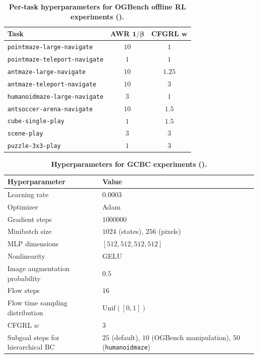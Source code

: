 \documentclass{article}
\begin{document}
\begin{table}[t]
\caption{
\footnotesize
\textbf{Per-task hyperparameters for OGBench offline RL experiments ().}
}
\vspace{5pt}
\label{table:hyp_offline_ogbench_pertask}
\begin{center}
\scalebox{0.8}
{
\begin{tabular}{lcc}
\toprule
\textbf{Task} & \textbf{AWR} $\bm{1/\beta}$ & \textbf{CFGRL} $\bm{w}$ \\
\midrule

\texttt{pointmaze-large-navigate} & $10$ & $1$ \\
\texttt{pointmaze-teleport-navigate} & $1$ & $1$ \\
\texttt{antmaze-large-navigate} & $10$ & $1.25$ \\
\texttt{antmaze-teleport-navigate} & $10$ & $3$ \\
\texttt{humanoidmaze-large-navigate} & $3$ & $1$ \\
\texttt{antsoccer-arena-navigate} & $10$ & $1.5$ \\
\texttt{cube-single-play} & $1$ & $1.5$ \\
\texttt{scene-play} & $3$ & $3$ \\
\texttt{puzzle-3x3-play} & $1$ & $3$ \\

\bottomrule
\end{tabular}
}
\end{center}
\end{table} 



\begin{table}[t]
\caption{
\footnotesize
\textbf{Hyperparameters for GCBC experiments ().}
}
\vspace{5pt}
\label{table:hyp_gcbc}
\begin{center}
\scalebox{0.8}
{
\begin{tabular}{ll}
    \toprule
    \textbf{Hyperparameter} & \textbf{Value} \\
    \midrule
    Learning rate & $0.0003$ \\
    Optimizer & Adam~\citep{adam_kingma2015} \\
    Gradient steps & $1000000$ \\
    Minibatch size & $1024$ (states), $256$ (pixels) \\
    MLP dimensions & $[512, 512, 512, 512]$ \\
    Nonlinearity & GELU~\citep{gelu_hendrycks2016} \\
    Image augmentation probability & $0.5$ \\
    Flow steps & $16$ \\
    Flow time sampling distribution & $\mathrm{Unif}([0, 1])$ \\
    CFGRL $w$ & $3$ \\
    Subgoal steps for hierarchical BC & $25$ (default), $10$ (OGBench manipulation), $50$ (\texttt{humanoidmaze}) \\
    \bottomrule
\end{tabular}
}
\end{center}
\end{table} 
\end{document}
